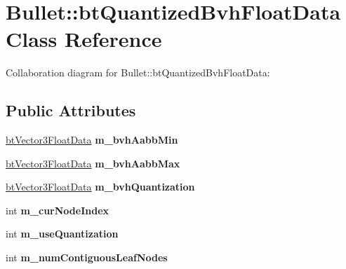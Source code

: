 \hypertarget{class_bullet_1_1bt_quantized_bvh_float_data}{\section{Bullet\+:\+:bt\+Quantized\+Bvh\+Float\+Data Class Reference}
\label{class_bullet_1_1bt_quantized_bvh_float_data}
}


Collaboration diagram for Bullet\+:\+:bt\+Quantized\+Bvh\+Float\+Data\+:
\subsection*{Public Attributes}
\begin{DoxyCompactItemize}
\item 
\hypertarget{class_bullet_1_1bt_quantized_bvh_float_data_a20dee51aa3013e30da6cdf56ef087d79}{\hyperlink{class_bullet_1_1bt_vector3_float_data}{bt\+Vector3\+Float\+Data} {\bfseries m\+\_\+bvh\+Aabb\+Min}}\label{class_bullet_1_1bt_quantized_bvh_float_data_a20dee51aa3013e30da6cdf56ef087d79}

\item 
\hypertarget{class_bullet_1_1bt_quantized_bvh_float_data_a00ecf087337d8020c418a2aa805c5cb6}{\hyperlink{class_bullet_1_1bt_vector3_float_data}{bt\+Vector3\+Float\+Data} {\bfseries m\+\_\+bvh\+Aabb\+Max}}\label{class_bullet_1_1bt_quantized_bvh_float_data_a00ecf087337d8020c418a2aa805c5cb6}

\item 
\hypertarget{class_bullet_1_1bt_quantized_bvh_float_data_abc1b5a0c269ed985ecc7a6c6b547e995}{\hyperlink{class_bullet_1_1bt_vector3_float_data}{bt\+Vector3\+Float\+Data} {\bfseries m\+\_\+bvh\+Quantization}}\label{class_bullet_1_1bt_quantized_bvh_float_data_abc1b5a0c269ed985ecc7a6c6b547e995}

\item 
\hypertarget{class_bullet_1_1bt_quantized_bvh_float_data_a1a1aeefb2bd7df4f0a4df5b04ea8e7ea}{int {\bfseries m\+\_\+cur\+Node\+Index}}\label{class_bullet_1_1bt_quantized_bvh_float_data_a1a1aeefb2bd7df4f0a4df5b04ea8e7ea}

\item 
\hypertarget{class_bullet_1_1bt_quantized_bvh_float_data_a5f2bb8b3e837576948f4e07d22ab690c}{int {\bfseries m\+\_\+use\+Quantization}}\label{class_bullet_1_1bt_quantized_bvh_float_data_a5f2bb8b3e837576948f4e07d22ab690c}

\item 
\hypertarget{class_bullet_1_1bt_quantized_bvh_float_data_a5ab391fb19cde7203656c202847b0170}{int {\bfseries m\+\_\+num\+Contiguous\+Leaf\+Nodes}}\label{class_bullet_1_1bt_quantized_bvh_float_data_a5ab391fb19cde7203656c202847b0170}


\end{DoxyCompactItemize}
